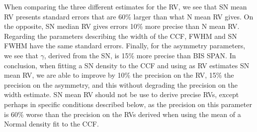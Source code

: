 \documentclass{aa}
\begin{document}
When comparing the three different estimates for the RV, we see that SN mean RV presents standard errors that are 60\% larger than what N mean RV gives. On the opposite, SN median RV gives errors 10\% more precise than N mean RV. Regarding the parameters describing the width of the CCF, FWHM and SN FWHM have the same standard errors. Finally, for the asymmetry parameters, we see that $\gamma$, derived from the SN, is 15\% more precise than BIS SPAN. In conclusion, when fitting a SN density to the CCF and using as RV estimates SN mean RV, we are able to improve by 10\% the precision on the RV, 15\% the precision on the asymmetry, and this without degrading the precision on the width estimate. SN mean RV should not be use to derive precise RVs, except perhaps in specific conditions described below, as the precision on this parameter is 60\% worse than the precision on the RVs derived when using the mean of a Normal density fit to the CCF.
%
\end{document}
